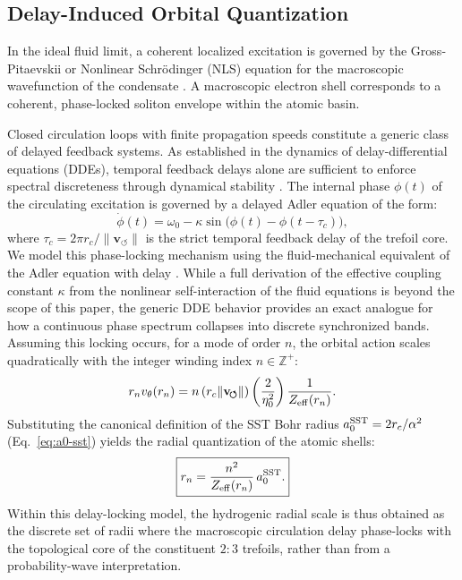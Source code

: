 \documentclass[11pt,a4paper]{article}
\begin{document}
    \subsection{Delay-Induced Orbital Quantization}
        In the ideal fluid limit, a coherent localized excitation is governed by the Gross-Pitaevskii or Nonlinear Schr\"odinger (NLS) equation for the macroscopic wavefunction of the condensate \cite{Pitaevskii2003}. A macroscopic electron shell corresponds to a coherent, phase-locked soliton envelope within the atomic basin.
        
        Closed circulation loops with finite propagation speeds constitute a generic class of delayed feedback systems. As established in the dynamics of delay-differential equations (DDEs), temporal feedback delays alone are sufficient to enforce spectral discreteness through dynamical stability \cite{Erneux2009}. The internal phase $\phi(t)$ of the circulating excitation is governed by a delayed Adler equation of the form:
        \begin{equation}
            \label{eq:AdlerDelay}
            \dot{\phi}(t) = \omega_0 - \kappa \sin\bigl(\phi(t) - \phi(t-\tau_c)\bigr),
        \end{equation}
        where $\tau_c = 2\pi r_c / \lVert\mathbf{v}_{\!\boldsymbol{\circlearrowleft}}\rVert$ is the strict temporal feedback delay of the trefoil core. We model this phase-locking mechanism using the fluid-mechanical equivalent of the Adler equation with delay \cite{Adler1946}. While a full derivation of the effective coupling constant $\kappa$ from the nonlinear self-interaction of the fluid equations is beyond the scope of this paper, the generic DDE behavior provides an exact analogue for how a continuous phase spectrum collapses into discrete synchronized bands. Assuming this locking occurs, for a mode of order $n$, the orbital action scales quadratically with the integer winding index $n \in \mathbb{Z}^+$:
        \begin{equation}
            \label{eq:DelayLocking}
            r_n v_{\theta}(r_n) = n \left( r_c \lVert\mathbf{v}_{\!\boldsymbol{\circlearrowleft}}\rVert \right) \left( \frac{2}{\eta_0^2} \right) \frac{1}{Z_{\rm eff}(r_n)}.
        \end{equation}
        Substituting the canonical definition of the SST Bohr radius $a_0^{\rm SST} = 2r_c/\alpha^2$ (Eq.~\eqref{eq:a0-sst}) yields the radial quantization of the atomic shells:
        \begin{equation}
            \label{eq:SST_OrbitRadii}
            \boxed{
                r_n = \frac{n^2}{Z_{\rm eff}(r_n)} \, a_0^{\rm SST}.
            }
        \end{equation}
        Within this delay-locking model, the hydrogenic radial scale is thus obtained as the discrete set of radii where the macroscopic circulation delay phase-locks with the topological core of the constituent $2{:}3$ trefoils, rather than from a probability-wave interpretation.
    
\end{document}
